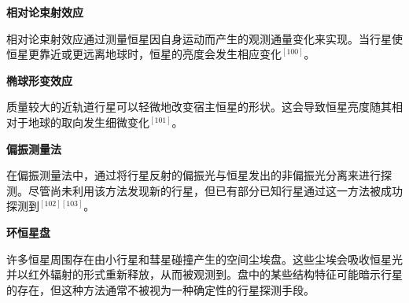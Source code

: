 \textbf{相对论束射效应}

相对论束射效应通过测量恒星因自身运动而产生的观测通量变化来实现。当行星使恒星更靠近或更远离地球时，恒星的亮度会发生相应变化$^{[100]}$。

\textbf{椭球形变效应}

质量较大的近轨道行星可以轻微地改变宿主恒星的形状。这会导致恒星亮度随其相对于地球的取向发生细微变化$^{[101]}$。

\textbf{偏振测量法}

在偏振测量法中，通过将行星反射的偏振光与恒星发出的非偏振光分离来进行探测。尽管尚未利用该方法发现新的行星，但已有部分已知行星通过这一方法被成功探测到$^{[102][103]}$。

\textbf{环恒星盘}

许多恒星周围存在由小行星和彗星碰撞产生的空间尘埃盘。这些尘埃会吸收恒星光并以红外辐射的形式重新释放，从而被观测到。盘中的某些结构特征可能暗示行星的存在，但这种方法通常不被视为一种确定性的行星探测手段。
